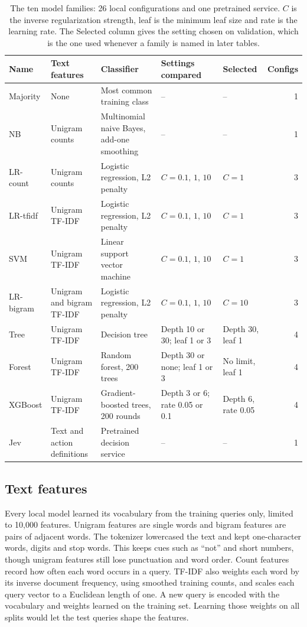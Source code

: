 \documentclass[conference]{IEEEtran}
\begin{document}
\begin{table}[tbp]
\centering\caption{The ten model families: 26 local configurations and one pretrained service. \(C\) is the inverse regularization strength, leaf is the minimum leaf size and rate is the learning rate. The Selected column gives the setting chosen on validation, which is the one used whenever a family is named in later tables.}\label{tab:methods}
\setlength{\tabcolsep}{4pt}
\begin{tabular}{lllllr}\toprule
Name & Text features & Classifier & Settings compared & Selected & Configs\\ \midrule
Majority & None & Most common training class & -- & -- & 1\\
NB & Unigram counts & Multinomial naive Bayes, add-one smoothing & -- & -- & 1\\
LR-count & Unigram counts & Logistic regression, L2 penalty & \(C=0.1,\,1,\,10\) & \(C=1\) & 3\\
LR-tfidf & Unigram TF-IDF & Logistic regression, L2 penalty & \(C=0.1,\,1,\,10\) & \(C=1\) & 3\\
SVM & Unigram TF-IDF & Linear support vector machine & \(C=0.1,\,1,\,10\) & \(C=1\) & 3\\
LR-bigram & Unigram and bigram TF-IDF & Logistic regression, L2 penalty & \(C=0.1,\,1,\,10\) & \(C=10\) & 3\\
Tree & Unigram TF-IDF & Decision tree & Depth 10 or 30; leaf 1 or 3 & Depth 30, leaf 1 & 4\\
Forest & Unigram TF-IDF & Random forest, 200 trees & Depth 30 or none; leaf 1 or 3 & No limit, leaf 1 & 4\\
XGBoost & Unigram TF-IDF & Gradient-boosted trees, 200 rounds & Depth 3 or 6; rate 0.05 or 0.1 & Depth 6, rate 0.05 & 4\\
Jev & Text and action definitions & Pretrained decision service & -- & -- & 1\\ \bottomrule
\end{tabular}
\end{table}

\subsection{Text features}
Every local model learned its vocabulary from the training queries only, limited to 10,000 features. Unigram features are single words and bigram features are pairs of adjacent words. The tokenizer lowercased the text and kept one-character words, digits and stop words. This keeps cues such as ``not'' and short numbers, though unigram features still lose punctuation and word order. Count features record how often each word occurs in a query. TF-IDF also weights each word by its inverse document frequency, using smoothed training counts, and scales each query vector to a Euclidean length of one. A new query is encoded with the vocabulary and weights learned on the training set. Learning those weights on all splits would let the test queries shape the features.
\end{document}
